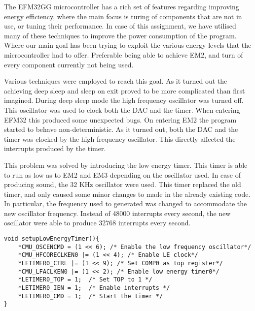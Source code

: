 The EFM32GG microcontroller has a rich set of features regarding improving energy efficiency, where the main focus is turing of components that are not in use, or tuning their performance. In case of this assignment, we have utilised many of these techniques to improve the power consumption of the program. Where our main goal has been trying to exploit the various energy levels that the microcontroller had to offer. Preferable being able to achieve EM2, and turn of every component currently not being used. 

Various techniques were employed to reach this goal. As it turned out the achieving deep sleep and sleep on exit proved to be more complicated than first imagined. During deep sleep mode the high frequency oscillator was turned off. This oscillator was used to clock both the DAC and the timer. When entering EFM32 this produced some unexpected bugs. On entering EM2 the program started to behave non-deterministic. As it turned out, both the DAC and the timer was clocked by the high frequency oscillator. This directly affected the interrupts produced by the timer.

This problem was solved by introducing the low energy timer. This timer is able to run as low as to EM2 and EM3 depending on the oscillator used. In case of producing sound, the 32 KHz oscillator were used. This timer replaced the old timer, and only caused some minor changes to made in the already existing code. In particular, the frequency used to generated was changed to accommodate the new oscillator frequency. Instead of 48000 interrupts every second, the new oscillator were able to produce 32768 interrupts every second.  


\begin{lstlisting}
void setupLowEnergyTimer(){
    *CMU_OSCENCMD = (1 << 6); /* Enable the low frequency oscillator*/
    *CMU_HFCORECLKEN0 |= (1 << 4); /* Enable LE clock*/
    *LETIMER0_CTRL |= (1 << 9); /* Set COMP0 as top register*/
    *CMU_LFACLKEN0 |= (1 << 2); /* Enable low energy timer0*/
    *LETIMER0_TOP = 1;  /* Set TOP to 1 */
    *LETIMER0_IEN = 1;  /* Enable interrupts */ 
    *LETIMER0_CMD = 1;  /* Start the timer */
}

\end{lstlisting}





